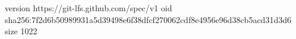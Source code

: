 version https://git-lfs.github.com/spec/v1
oid sha256:7f2d6b50989931a5d39498e6f38dfcf270062cdf8e4956e96d38cb5acd31d3d6
size 1022

